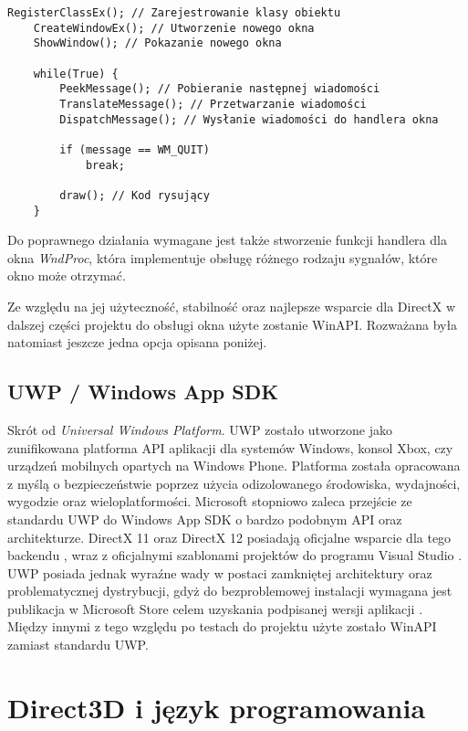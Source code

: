\begin{lstlisting}[caption={Pseudokod inicjalizacji okna WinAPI (oryginalna treść)}, label={lst:winapi:init}]
	RegisterClassEx(); // Zarejestrowanie klasy obiektu
	CreateWindowEx(); // Utworzenie nowego okna
	ShowWindow(); // Pokazanie nowego okna
	
	while(True) {
		PeekMessage(); // Pobieranie następnej wiadomości
		TranslateMessage(); // Przetwarzanie wiadomości
		DispatchMessage(); // Wysłanie wiadomości do handlera okna
	
		if (message == WM_QUIT)
			break;
		
		draw(); // Kod rysujący
	}
\end{lstlisting}

Do poprawnego działania wymagane jest także stworzenie funkcji handlera
dla okna \emph{WndProc}, która implementuje obsługę różnego rodzaju
sygnałów, które okno może otrzymać. 

Ze względu na jej użyteczność, stabilność oraz najlepsze wsparcie dla
DirectX w dalszej części projektu do obsługi okna użyte zostanie WinAPI. Rozważana była natomiast jeszcze jedna opcja opisana poniżej.

\subsection{UWP / Windows App SDK}

Skrót od \emph{Universal Windows Platform}. UWP zostało utworzone jako
zunifikowana platforma API aplikacji dla systemów Windows, konsol Xbox,
czy urządzeń mobilnych opartych na Windows Phone. Platforma została
opracowana z myślą o bezpieczeństwie poprzez użycia odizolowanego
środowiska, wydajności, wygodzie oraz wieloplatformości. Microsoft
stopniowo zaleca przejście ze standardu UWP do Windows App SDK o bardzo
podobnym API oraz architekturze. DirectX 11 oraz DirectX 12 posiadają oficjalne wsparcie dla tego
backendu \cite{ms:dxuwp:2024}, wraz z oficjalnymi szablonami projektów do programu
Visual Studio \cite{ms:dxuwpui:2024}. UWP posiada jednak wyraźne wady w postaci zamkniętej architektury oraz
problematycznej dystrybucji, gdyż do bezproblemowej instalacji wymagana
jest publikacja w Microsoft Store celem uzyskania podpisanej wersji
aplikacji \cite{ms:uwppackaging:2024}. Między innymi z tego względu po testach do projektu użyte zostało WinAPI
zamiast standardu UWP.

\section{Direct3D i język programowania}

